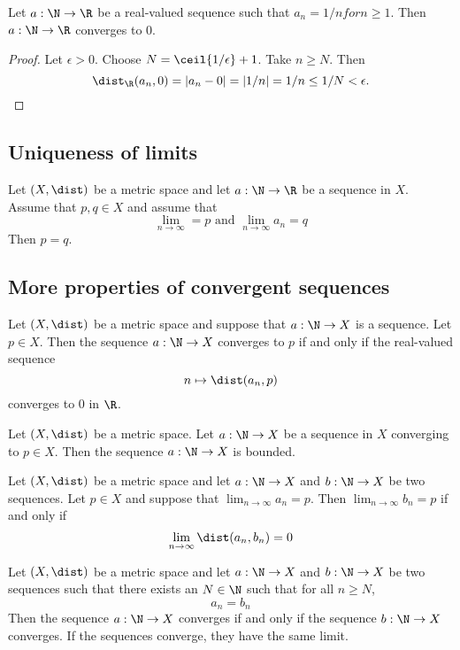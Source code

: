 \begin{example}
    Let $a: \N \to \R$ be a real-valued sequence such that $a_n = 1/n for n \ge 1$. Then $a: \N \to \R$ converges to $0$.
\end{example}

\begin{proof}
    Let $\epsilon > 0$. Choose $N = \ceil{1/\epsilon} + 1$. Take $n \ge N$. Then
    $$\dist_\R(a_n,0) = |a_n - 0| = |1/n| = 1/n \le 1/N < \epsilon.$$
\end{proof}

\subsection{Uniqueness of limits}
\begin{proposition}
    Let $(X, \dist)$ be a metric space and let $a: \N \to \R$ be a sequence in $X$. Assume that $p,q \in X$ and assume that
    $$\lim_{n\to\infty} = p \text{ and } \lim_{n\to\infty}a_n = q$$
    Then $p = q$.
\end{proposition}

\subsection{More properties of convergent sequences}
\begin{proposition}
    Let $(X, \dist)$ be a metric space and suppose that $a: \N \to X$ is a sequence. Let $p \in X$. Then the sequence $a: \N \to X$ converges to $p$ if and only if
    the real-valued sequence
    $$n \mapsto \dist(a_n, p)$$
    converges to 0 in $\R$.
\end{proposition}

\begin{proposition}
    Let $(X, \dist)$ be a metric space. Let $a: \N \to X$ be a sequence in $X$ converging to $p \in X$. Then the sequence $a: \N \to X$ is bounded.
\end{proposition}

\begin{proposition}
    Let $(X, \dist)$ be a metric space and let $a: \N \to X$ and $b: \N \to X$ be two sequences. Let $p \in X$ and suppose that $\lim_{n\to\infty}a_n = p$.
    Then $\lim_{n\to\infty}b_n = p$ if and only if
    $$\lim_{n\to\infty}\dist(a_n,b_n) = 0$$
\end{proposition}

\begin{corollary}
    Let $(X, \dist)$ be a metric space and let $a: \N \to X$ and $b: \N \to X$ be two sequences such that there exists an $N \in \N$ such that for all $n \ge N$,
    $$a_n = b_n$$
    Then the sequence $a: \N \to X$ converges if and only if the sequence $b: \N \to X$ converges. If the sequences converge, they have the same limit.
\end{corollary}

